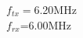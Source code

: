 \documentclass[preview]{standalone}
\begin{document}
\begin{center}
$f_{tx}=$6.20MHz\\$f_{rx}$=6.00MHz
\end{center}
\end{document}

